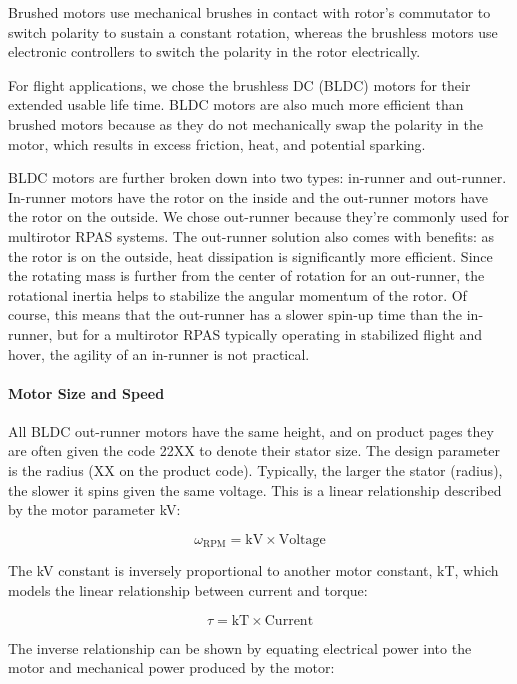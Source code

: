 Brushed motors use mechanical brushes in contact with rotor’s commutator to switch polarity to sustain a 
constant rotation, whereas the brushless motors use electronic controllers to switch the polarity in the 
rotor electrically. 

For flight applications, we chose the brushless DC (BLDC) motors for their extended usable life time. 
BLDC motors are also much more efficient than brushed motors because as they do not mechanically swap 
the polarity in the motor, which results in excess friction, heat, and potential sparking.

BLDC motors are further broken down into two types: in-runner and out-runner. In-runner motors have the rotor 
on the inside and the out-runner motors have the rotor on the outside. We chose out-runner because they’re 
commonly used for multirotor RPAS systems. The out-runner solution also comes with benefits: as the rotor is on the 
outside, heat dissipation is significantly more efficient. Since the rotating mass is further from the 
center of rotation for an out-runner, the rotational inertia helps to stabilize the angular momentum of the 
rotor. Of course, this means that the out-runner has a slower spin-up time than the in-runner, but for a 
multirotor RPAS typically operating in stabilized flight and hover, the agility of an in-runner is not 
practical.

\paragraph{Motor Size and Speed}\label{section:motor-speed}

All BLDC out-runner motors have the same height, and on product pages they are often given the code 22XX to denote their stator size. The design parameter is the radius (XX on the product code). Typically, the larger the stator (radius), the slower it spins given the same voltage. This is a linear relationship described by the motor parameter kV:

$$
\omega_{\mathrm{RPM}} = \mathrm{kV} \times \mathrm{Voltage}
$$

The kV constant is inversely proportional to another motor constant, kT, which models the linear relationship between current and torque:

$$
\tau = \mathrm{kT} \times \mathrm{Current}
$$

The inverse relationship can be shown by equating electrical power into the motor and mechanical power produced by the motor:

